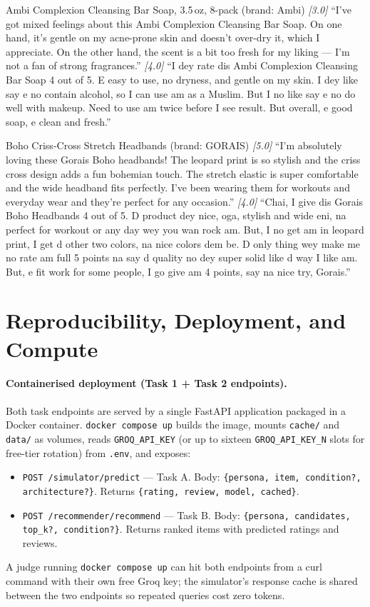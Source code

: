 \documentclass[8pt,twocolumn,a4paper]{extarticle}
\begin{document}
{Ambi Complexion Cleansing Bar Soap, 3.5\,oz, 8-pack (brand: Ambi)}
{\textit{[3.0]} ``I've got mixed feelings about this Ambi Complexion Cleansing Bar Soap. On one hand, it's gentle on my acne-prone skin and doesn't over-dry it, which I appreciate. On the other hand, the scent is a bit too fresh for my liking --- I'm not a fan of strong fragrances.''}
{\textit{[4.0]} ``I dey rate dis Ambi Complexion Cleansing Bar Soap 4 out of 5. E easy to use, no dryness, and gentle on my skin. I dey like say e no contain alcohol, so I can use am as a Muslim. But I no like say e no do well with makeup. Need to use am twice before I see result. But overall, e good soap, e clean and fresh.''}

{Boho Criss-Cross Stretch Headbands (brand: GORAIS)}
{\textit{[5.0]} ``I'm absolutely loving these Gorais Boho headbands! The leopard print is so stylish and the criss cross design adds a fun bohemian touch. The stretch elastic is super comfortable and the wide headband fits perfectly. I've been wearing them for workouts and everyday wear and they're perfect for any occasion.''}
{\textit{[4.0]} ``Chai, I give dis Gorais Boho Headbands 4 out of 5. D product dey nice, oga, stylish and wide eni, na perfect for workout or any day wey you wan rock am. But, I no get am in leopard print, I get d other two colors, na nice colors dem be. D only thing wey make me no rate am full 5 points na say d quality no dey super solid like d way I like am. But, e fit work for some people, I go give am 4 points, say na nice try, Gorais.''}


\section{Reproducibility, Deployment, and Compute}
\label{app:repro}

\paragraph{Containerised deployment (Task 1 + Task 2 endpoints).}
Both task endpoints are served by a single FastAPI application packaged in a Docker container. \texttt{docker compose up} builds the image, mounts \texttt{cache/} and \texttt{data/} as volumes, reads \texttt{GROQ\_API\_KEY} (or up to sixteen \texttt{GROQ\_API\_KEY\_N} slots for free-tier rotation) from \texttt{.env}, and exposes:
\begin{itemize}\setlength\itemsep{0pt}
\item \texttt{POST /simulator/predict} --- Task A. Body: \texttt{\{persona, item, condition?, architecture?\}}. Returns \texttt{\{rating, review, model, cached\}}.
\item \texttt{POST /recommender/recommend} --- Task B. Body: \texttt{\{persona, candidates, top\_k?, condition?\}}. Returns ranked items with predicted ratings and reviews.
\end{itemize}
A judge running \texttt{docker compose up} can hit both endpoints from a curl command with their own free Groq key; the simulator's response cache is shared between the two endpoints so repeated queries cost zero tokens.
\end{document}
